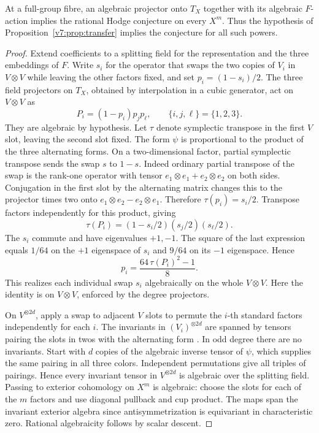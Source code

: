 \begin{theorem}\label{v7:thm:powers}
At a full-group fibre, an algebraic projector onto \(T_X\) together with its algebraic \(F\)-action implies the rational Hodge conjecture on every \(X^m\). Thus the hypothesis of Proposition~\ref{v7:prop:transfer} implies the conjecture for all such powers.
\end{theorem}
\begin{proof}
Extend coefficients to a splitting field for the representation and the three embeddings of \(F\). Write \(s_i\) for the operator that swaps the two copies of \(V_i\) in \(V\otimes V\) while leaving the other factors fixed, and set \(p_i=(1-s_i)/2\). The three field projectors on \(T_X\), obtained by interpolation in a cubic generator, act on \(V\otimes V\) as
\[
 P_i=(1-p_i)p_jp_\ell,\qquad \{i,j,\ell\}=\{1,2,3\}.
\]
They are algebraic by hypothesis. Let \(\tau\) denote symplectic transpose in the first \(V\) slot, leaving the second slot fixed. The form \(\psi\) is proportional to the product of the three alternating forms. On a two-dimensional factor, partial symplectic transpose sends the swap \(s\) to \(1-s\). Indeed ordinary partial transpose of the swap is the rank-one operator with tensor \(e_1\otimes e_1+e_2\otimes e_2\) on both sides. Conjugation in the first slot by the alternating matrix changes this to the projector times two onto \(e_1\otimes e_2-e_2\otimes e_1\). Therefore \(\tau(p_i)=s_i/2\). Transpose factors independently for this product, giving
\[
 \tau(P_i)=(1-s_i/2)(s_j/2)(s_\ell/2).
\]
The \(s_i\) commute and have eigenvalues \(+1,-1\). The square of the last expression equals \(1/64\) on the \(+1\) eigenspace of \(s_i\) and \(9/64\) on its \(-1\) eigenspace. Hence
\[
 p_i=\frac{64\,\tau(P_i)^2-1}{8}.
\]
This realizes each individual swap \(s_i\) algebraically on the whole \(V\otimes V\). Here the identity is on \(V\otimes V\), enforced by the degree projectors.

On \(V^{\otimes 2d}\), apply a swap to adjacent \(V\) slots to permute the \(i\)-th standard factors independently for each \(i\). The invariants in \((V_i)^{\otimes 2d}\) are spanned by tensors pairing the slots in twos with the alternating form \cite{Weyl39}. In odd degree there are no invariants. Start with \(d\) copies of the algebraic inverse tensor of \(\psi\), which supplies the same pairing in all three colors. Independent permutations give all triples of pairings. Hence every invariant tensor in \(V^{\otimes 2d}\) is algebraic over the splitting field. Passing to exterior cohomology on \(X^m\) is algebraic: choose the slots for each of the \(m\) factors and use diagonal pullback and cup product. The maps span the invariant exterior algebra since antisymmetrization is equivariant in characteristic zero. Rational algebraicity follows by scalar descent.
\end{proof}

